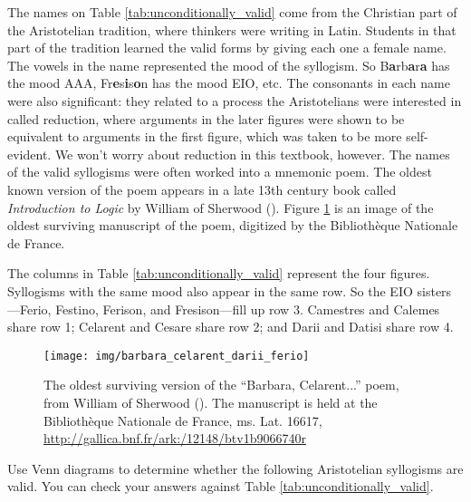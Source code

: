 The names on Table \ref{tab:unconditionally_valid} come from the Christian part of the Aristotelian tradition, where thinkers were writing in Latin. Students in that part of the tradition learned the valid forms by giving each one a female name. The vowels in the name represented the mood of the syllogism. So B\textbf{a}rb\textbf{a}r\textbf{a} has the mood AAA, Fr\textbf{e}s\textbf{i}s\textbf{o}n has the mood EIO, etc. The consonants in each name were also significant: they related to a process the Aristotelians were interested in called reduction, where arguments in the later figures were shown to be equivalent to arguments in the first figure, which was taken to be more self-evident. We won't worry about reduction in this textbook, however. The names of the valid syllogisms were often worked into a mnemonic poem. The oldest known version of the poem appears in a late 13th century book called \textit{Introduction to Logic} by William of Sherwood (\cite{Sherwood1275}). Figure \ref{fig:barbara,celarent} is an image of the oldest surviving manuscript of the poem, digitized by the Bibliothèque Nationale de France.

The columns in Table \ref{tab:unconditionally_valid} represent the four figures. Syllogisms with the same mood also appear in the same row. So the EIO sisters---Ferio, Festino, Ferison, and Fresison---fill up row 3.  Camestres and Calemes share row 1;  Celarent and Cesare share row 2; and Darii and Datisi share row 4.   

\begin{figure}[b]
\begin{mdframed}[style=mytableclearbox]
\texttt{[image: img/barbara\_celarent\_darii\_ferio]} 
\end{mdframed}
\caption{The oldest surviving version of the ``Barbara, Celarent...'' poem, from William of Sherwood (\cite*{Sherwood1275}). The manuscript is held at the Biblioth\`eque Nationale de France, ms. Lat. 16617, \url{http://gallica.bnf.fr/ark:/12148/btv1b9066740r}}
\label{fig:barbara,celarent}
\end{figure}



\practiceproblems
\label{venn_proofs}
\problempart Use Venn diagrams to determine whether the following Aristotelian syllogisms are valid. You can check your answers against Table \ref{tab:unconditionally_valid}.

